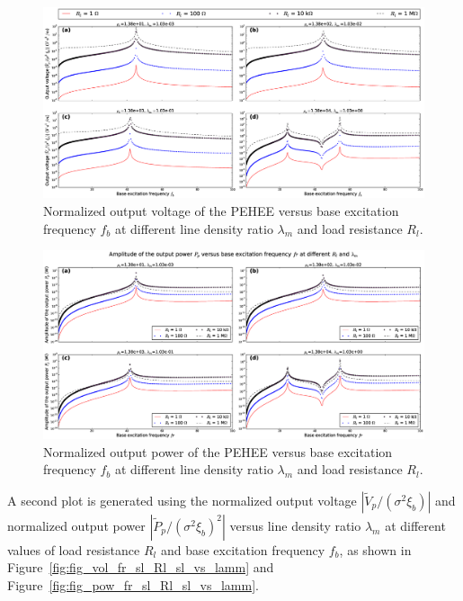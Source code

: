 \documentclass{elsarticle}
\begin{document}
\begin{figure}[!htbp]
    \centering
    \includegraphics[width=\textwidth]{./fig_output_voltage_vs_fr_Rl_lamm_all}
    \caption{ Normalized output voltage of the PEHEE versus base excitation frequency $f_b$ at different line density ratio $\lambda_m$ and load resistance $R_l$.}
    \label{fig:fig_output_voltage_vs_fr_Rl_lamm_all}
\end{figure}

\begin{figure}[!htbp]
    \centering
    \includegraphics[width=\textwidth]{./fig_output_power_vs_fr_Rl_lamm_all}
    \caption{ Normalized output power of the PEHEE versus base excitation frequency $f_b$ at different line density ratio $\lambda_m$ and load resistance $R_l$.}
    \label{fig:fig_output_power_vs_fr_Rl_lamm_all}
\end{figure}

A second plot is generated using the normalized output voltage $|\tilde{V}_p/(\sigma^2 \xi_b)|$ and normalized output power $|\tilde{P}_p/(\sigma^2 \xi_b)^2|$ versus line density ratio $\lambda_m$ at different values of load resistance $R_l$ and base excitation frequency $f_b$, as shown in Figure~\ref{fig:fig_vol_fr_sl_Rl_sl_vs_lamm} and Figure~\ref{fig:fig_pow_fr_sl_Rl_sl_vs_lamm}. 
\end{document}
